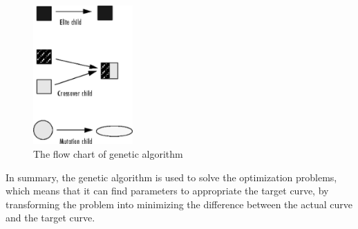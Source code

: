 \documentclass[a4paper]{tufte-handout} %
\begin{document}
\begin{figure}[h]
    \centering
	\includegraphics[width=1.5in]{Image/CreateNextGeneration.png}
	\caption{The flow chart of genetic algorithm}
	\label{fig:textfig}
\end{figure}

In summary, the genetic algorithm is used to solve the optimization problems, which means that it can find parameters to appropriate the target curve, by transforming the problem into minimizing the difference between the actual curve and the target curve.
\end{document}
